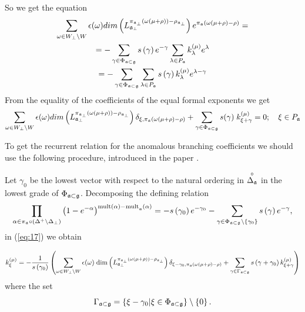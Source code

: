 \documentclass[a4paper,12pt]{article}
\theoremstyle{definition} \newtheorem{Def}{Definition}
\begin{document}
So we get the equation
\begin{multline}
  \label{eq:16}
  \sum_{\omega\in W_{\bot}\backslash W} \epsilon(\omega) dim\left(L^{\pi_{\mathfrak{a}_{\bot}}(\omega(\mu+\rho))-\rho_{\mathfrak{a}_{\bot}}}_{\mathfrak{a}_{\bot}}\right) e^{\pi_{\mathfrak{a}}(\omega(\mu+\rho)-\rho)}=\\
  = -\sum_{\gamma \in \Phi _{\frak{a}\subset \frak{g}}} s\left( \gamma \right) e^{-\gamma }\sum_{\lambda \in P_{\frak{a}}}
  k_{\lambda }^{\left( \mu \right) }e^{\lambda } \\
  =-\sum_{\gamma \in \Phi _{\frak{a}\subset \frak{g}}}\sum_{\lambda \in P_{\frak{a}}}s\left( \gamma \right) k_{\lambda }^{\left( \mu \right)}e^{\lambda -\gamma }
\end{multline}
From the equality of the coefficients of the equal formal exponents we get
\begin{equation}
  \label{eq:17}
   \sum_{\omega\in W_{\bot}\backslash W} \epsilon(\omega) dim\left(L^{\pi_{\mathfrak{a}_{\bot}}(\omega(\mu+\rho))-\rho_{\mathfrak{a}_{\bot}}}_{\mathfrak{a}_{\bot}}\right) \delta_{\xi,\pi_{\mathfrak{a}}(\omega(\mu+\rho)-\rho)}+
   \sum_{\gamma \in \Phi _{\frak{a}\subset \frak{g}}} s(\gamma)\; k^{(\mu)}_{\xi+\gamma}=0;\quad \xi\in P_{\mathfrak{a}}
\end{equation}

To get the recurrent relation for the anomalous branching coefficients we should use the following procedure, introduced in the paper \cite{ilyin812pbc}.

Let $\gamma
_{0} $ be the lowest vector with respect to the natural ordering in $%
\overset{\circ }{\Delta _{\frak{a}}}$ in the lowest grade of $\Phi _{\frak{a}\subset \frak{g}}$. Decomposing the defining relation 
\begin{equation}
  \label{eq:18}
  \prod_{\alpha\in \pi_{\mathfrak{a}}\circ (\Delta^{+}\setminus \Delta_{\bot})}\left(
    1-e^{-\alpha }\right) ^{\mathrm{{mult}\left( \alpha \right) -{mult}}_{\frak{a%
      }}\mathrm{\left( \alpha \right) }}=-s\left( \gamma _{0}\right) e^{-\gamma
    _{0}}-\sum_{\gamma \in \Phi _{\frak{a}\subset \frak{g}}\setminus \left\{\gamma_{0}\right\}}s\left( \gamma \right) e^{-\gamma },  
\end{equation}
in (\ref{eq:17}) we obtain

\begin{equation}
k_{\xi }^{\left( \mu \right) }=-\frac{1}{s\left( \gamma _{0}\right) }\left(
  \sum_{\omega\in W_{\bot}\backslash W} \epsilon(\omega)\; {\rm dim}\left(L^{\pi_{\mathfrak{a}_{\bot}}(\omega(\mu+\rho))-\rho_{\mathfrak{a}_{\bot}}}_{\mathfrak{a}_{\bot}}\right) \delta_{\xi-\gamma_0,\pi_{\mathfrak{a}}(\omega(\mu+\rho)-\rho)}+
\sum_{\gamma \in
\Gamma _{\frak{a}\subset \frak{g}}}s\left( \gamma +\gamma _{0}\right) k_{\xi
+\gamma }^{\left( \mu \right) }\right)   \label{recurrent relation}
\end{equation}
where the set 
\begin{equation}
\Gamma _{\frak{a}\subset \frak{g}}=\left\{ \xi -\gamma _{0}|\xi \in \Phi _{%
\frak{a}\subset \frak{g}}\right\} \setminus \left\{ 0\right\} .
\label{fan-defined}
\end{equation}
\end{document}
